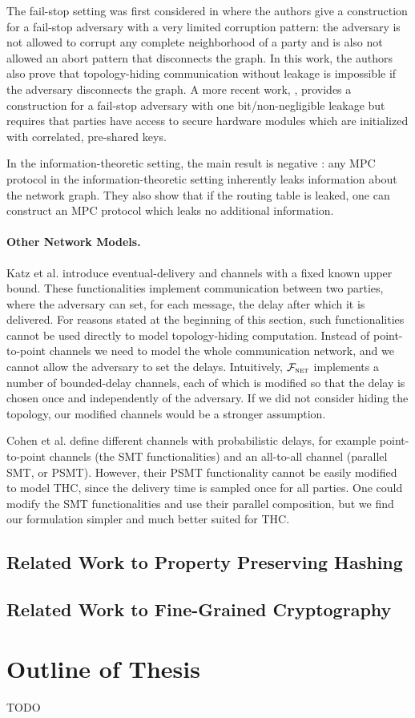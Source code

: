 The fail-stop setting was first considered in \cite{TCC:MorOrlRic15} where the authors give a construction for a fail-stop adversary with a very limited corruption pattern: the adversary is not allowed to corrupt any complete neighborhood of a party and is also not allowed an abort pattern that disconnects the graph. In this work, the authors also prove that topology-hiding communication without leakage is impossible if the adversary disconnects the graph. A more recent work, \cite{BBMM18}, provides a construction for a fail-stop adversary with one bit/non-negligible leakage but requires that parties have access to secure hardware modules which are initialized with correlated, pre-shared keys.

In the information-theoretic setting, the main result is negative \cite{HJ07}: any MPC protocol in the information-theoretic setting inherently leaks information about the network graph. They also show that if the routing table is leaked, one can construct an MPC protocol which leaks no additional information.

\paragraph{Other Network Models.}
Katz et al. \cite{KMTZ13} introduce eventual-delivery and channels with a 
fixed known upper bound. These functionalities implement communication between 
two parties, where the adversary can set, for each message, the delay after 
which it is delivered. For reasons stated at the beginning of this section, 
such functionalities cannot be used directly to model topology-hiding 
computation. Instead of point-to-point channels we need to model the whole 
communication network, and we cannot allow the adversary to set the delays. 
Intuitively, $\mathcal{F}_{\textsc{net}}$ implements a number of bounded-delay channels, each of 
which is modified so that the delay is chosen once and independently of the 
adversary. If we did not consider hiding the topology, our modified channels 
would be a stronger assumption.

Cohen et al. \cite{CCGZ16} define different channels with probabilistic 
delays, for example point-to-point channels (the SMT functionalities) and an 
all-to-all channel (parallel SMT, or PSMT).
However, their PSMT functionality cannot be easily modified to model THC, since 
the delivery time is sampled once for all parties.
One could modify the SMT functionalities and use their parallel composition, 
but we find our formulation simpler and much better suited for THC.

\subsection{Related Work to Property Preserving Hashing}

\subsection{Related Work to Fine-Grained Cryptography}

\section{Outline of Thesis}
TODO
